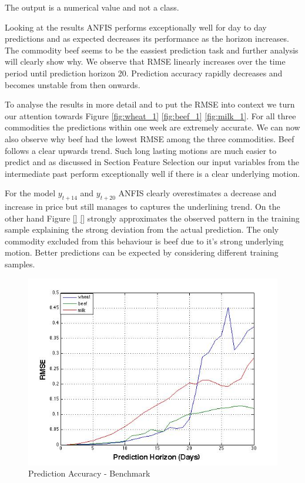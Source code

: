 The output is a numerical value and not a class. 

 Looking at the results ANFIS performs exceptionally well for day to day predictions and as expected decreases its performance as the horizon increases. The commodity beef seems to be the eassiest prediction task and further analysis will clearly show why.   We observe that RMSE linearly increases over the time period until prediction horizon 20. Prediction accuracy rapidly decreases and becomes unstable from then onwards.  

To analyse the results in more detail and to put the RMSE into context  we turn our attention towards Figure \ref{fig:wheat_1} \ref{fig:beef_1} \ref{fig:milk_1}. For all three commodities the predictions within one week are extremely accurate. We can now also observe why beef had the lowest RMSE among the three commodities. Beef follows a clear upwards trend. Such long lasting motions are much easier to predict and as discussed in Section Feature Selection our input variables from the intermediate past perform exceptionally well if there is a clear underlying motion. 

 For the model $y_{t+14}$ and $y_{t+20}$  ANFIS clearly overestimates a decrease and increase in price but still manages to captures the underlining trend. On the other hand Figure \ref{} \ref{} strongly approximates the observed pattern in the training sample explaining the strong deviation from the actual prediction. The only commodity excluded from this behaviour is beef due to it's strong underlying motion. Better predictions can be expected by considering different training samples. 






\begin{figure}[H]
        \centering
         \includegraphics[width=1\textwidth ]{img/model/prediction_days_1}      
        \caption{Prediction Accuracy - Benchmark }
        \label{fig:res_1}
\end{figure}









